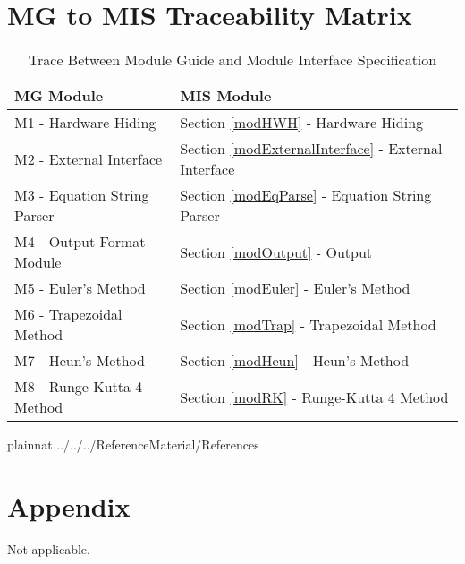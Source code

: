 \documentclass[12pt, titlepage]{article}
\begin{document}
\newpage

\section{MG to MIS Traceability Matrix}
\begin{table}[H]
\centering
\begin{tabular}{p{} p{}}
\toprule
\textbf{MG Module} & \textbf{MIS Module}\\
\midrule
M1 - Hardware Hiding & Section \ref{modHWH} - Hardware Hiding\\
M2 - External Interface & Section \ref{modExternalInterface} - External Interface\\
M3 - Equation String Parser & Section \ref{modEqParse} - Equation String Parser\\
M4 - Output Format Module & Section \ref{modOutput} - Output\\
M5 - Euler's Method & Section \ref{modEuler} - Euler's Method\\
M6 - Trapezoidal Method & Section \ref{modTrap} - Trapezoidal Method\\
M7 - Heun's Method & Section \ref{modHeun} - Heun's Method\\
M8 - Runge-Kutta 4 Method & Section \ref{modRK} - Runge-Kutta 4 Method\\

\bottomrule
\end{tabular}
\caption{Trace Between Module Guide and Module Interface Specification}
\label{TblRT}
\end{table}


\newpage

 {plainnat}
 {../../../ReferenceMaterial/References}

\newpage

\section{Appendix} \label{Appendix}

Not applicable. 
\end{document}
